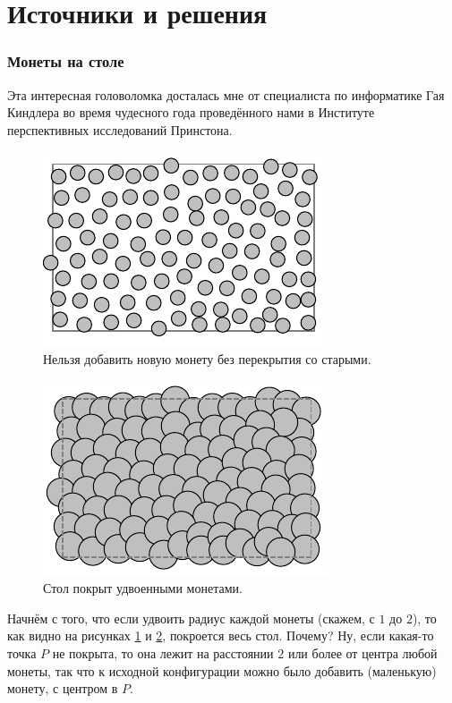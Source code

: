 \section*{Источники и решения}

\subsubsection*{Монеты на столе}

Эта интересная головоломка досталась мне от специалиста по информатике Гая Киндлера во время чудесного года проведённого нами в Институте перспективных исследований Принстона.

\begin{figure}[t!]
\centering
\includegraphics[scale=1]{pics/coin1}
\caption{Нельзя добавить новую монету без перекрытия со старыми.}
\label{pic:coin1}
\end{figure}

\begin{figure}[b!]
\centering
\includegraphics[scale=1]{pics/coin2}
\caption{Стол покрыт удвоенными монетами.}
\label{pic:coin2}
\end{figure}

Начнём с того, что если удвоить радиус каждой монеты (скажем, с $1$ до $2$), то как видно на рисунках \ref{pic:coin1} и \ref{pic:coin2}, покроется весь стол.
Почему?
Ну, если какая-то точка $P$ не покрыта, то она лежит на расстоянии $2$ или более от центра любой монеты, так что к исходной конфигурации можно было добавить (маленькую) монету, с центром в $P$.

